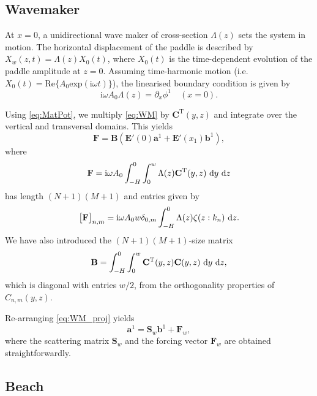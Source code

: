 \documentclass[12pt,a4paper]{article}
\newcommand{\real}{\textrm{Re}}
\newcommand{\wrt}{ ~ {\rm d}}
\def\ci{{\mathrm i}}
\newcommand{\ie}{i.e.\ }
\newcommand{\vp}{{\phi}}
\newcommand{\vm}{{\zeta}}
\begin{document}
\subsection{Wavemaker}

At $x=0$, a unidirectional wave maker of cross-section $\Lambda(z)$ sets the system in motion. The 
horizontal displacement of the paddle is described by $X_w(z,t)=\Lambda(z)X_0(t)$, where $X_0(t)$ is the 
time-dependent evolution of the paddle amplitude at $z = 0$. Assuming time-harmonic motion (\ie 
$X_0(t) = \real\{A_0\mathrm{exp}(\ci\omega t)\}$), the linearised 
boundary condition is given by
\begin{equation}
  \label{eq:WM}
  \ci \omega A_0 \Lambda(z) = \partial_x \vp^1 \quad (x=0).
\end{equation}

Using \eqref{eq:MatPot}, we multiply \eqref{eq:WM} by $\mathbf{C}^{\mathrm{T}}(y,z)$ and integrate over the 
vertical and transversal domains. This yields
\begin{equation}
  \label{eq:WM_proj}
  \mathbf{F} = \mathbf{B}\left(\mathbf{E}'(0)\mathbf{a}^1 + \mathbf{E}'(x_1)\mathbf{b}^1\right),
\end{equation}
where
\[
  \mathbf{F} = \ci \omega A_0 \int_{-H}^0 \int_0^w \Lambda(z) \mathbf{C}^{\mathrm{T}}(y,z) \wrt y \wrt z
\]
has length $(N+1)(M+1)$ and entries given by 
\[
  \big[\mathbf{F}\big]_{n,m} = \ci \omega A_0 w \delta_{0,m} \int_{-H}^0 \Lambda(z) \vm(z:k_{n}) \wrt z.
\]
We have also introduced the $(N+1)(M+1)$-size matrix
\[
  \mathbf{B} = \int_{-H}^0 \int_0^w \mathbf{C}^{\mathrm{T}}(y,z) \mathbf{C}(y,z) \wrt y \wrt z,
\]
which is diagonal with entries $w/2$, from the orthogonality properties of $C_{n,m}(y,z)$.

Re-arranging \eqref{eq:WM_proj} yields 
\begin{equation}
  \mathbf{a}^1 = \mathbf{S}_w\mathbf{b}^1 + \mathbf{F}_w,
\end{equation}
where the scattering matrix $\mathbf{S}_w$ and the forcing vector $\mathbf{F}_w$ are obtained 
straightforwardly.


\subsection{Beach}
\end{document}
